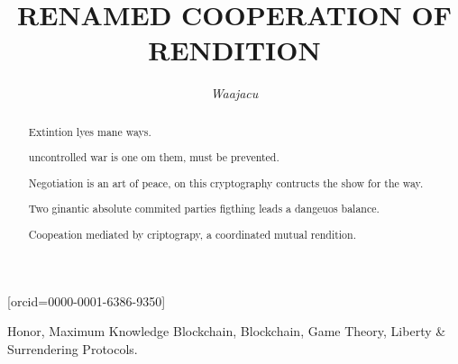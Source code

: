 \documentclass[a4paper,fleqn]{cas-sc}
\begin{document}
\let\WriteBookmarks\relax
\def\floatpagepagefraction{1}
\def\textpagefraction{.001}

\title[mode = title]{RENAMED COOPERATION OF RENDITION}




  \author[1]{\textit{Waajacu}}[orcid=0000-0001-6386-9350]
  \cormark[1] 


  \address[1]{Santiago Restrepo Ruiz, Colombia.}





 \begin{abstract}
  Extintion lyes mane ways. 

  uncontrolled war is one om them, must be prevented. 

  Negotiation is an art of peace, on this cryptography contructs the show for the way. 

  Two ginantic absolute commited parties figthing leads a dangeuos balance. 
  
  Coopeation mediated by criptograpy, a coordinated mutual rendition. 


\end{abstract}
 \begin{keywords}
  Honor, Maximum Knowledge Blockchain, Blockchain, Game Theory, Liberty \& Surrendering Protocols. 
 \end{keywords}
\end{document}
